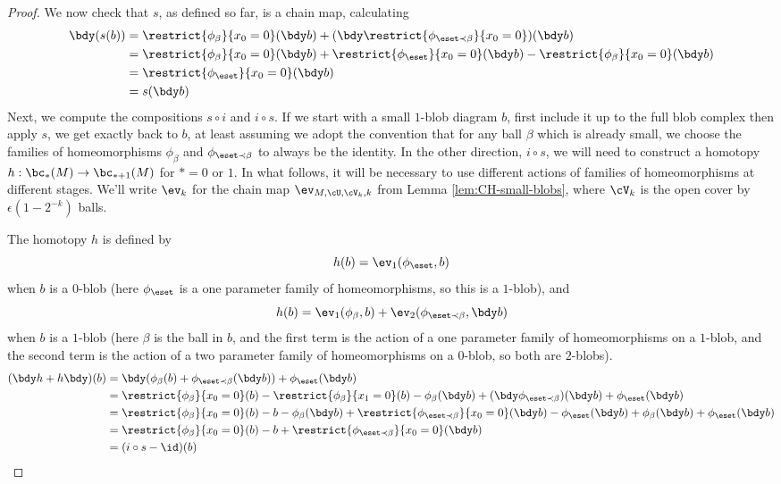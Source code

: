 \begin{proof}
We now check that $s$, as defined so far, is a chain map, calculating
\begin{align*}
\bdy (s(b)) & = \restrict{\phi_\beta}{x_0=0}(\bdy b) + (\bdy \restrict{\phi_{\eset \prec \beta}}{x_0=0})(\bdy b) \\
		 & = \restrict{\phi_\beta}{x_0=0}(\bdy b) + \restrict{\phi_\eset}{x_0=0}(\bdy b) - \restrict{\phi_\beta}{x_0=0}(\bdy b) \\
		 & = \restrict{\phi_\eset}{x_0=0}(\bdy b) \\
		 & = s(\bdy b)
\end{align*}
Next, we compute the compositions $s \circ i$ and $i \circ s$. If we start with a small $1$-blob diagram $b$, first include it up to the full blob complex then apply $s$, we get exactly back to $b$, at least assuming we adopt the convention that for any ball $\beta$ which is already small, we choose the families of homeomorphisms $\phi_\beta$ and $\phi_{\eset \prec \beta}$ to always be the identity. In the other direction, $i \circ s$, we will need to construct a homotopy $h:\bc_*(M) \to \bc_{*+1}(M)$ for $*=0$ or $1$.
In what follows, it will be necessary to use different actions of families of homeomorphisms at different stages. We'll write $\ev_k$ for the chain map $\ev_{M,\cU, \cV_k, k}$ from Lemma \ref{lem:CH-small-blobs}, where $\cV_k$ is the open cover by $\epsilon(1-2^{-k})$ balls.

The homotopy $h$ is defined by $$h(b) = \ev_1(\phi_\eset, b)$$ when $b$ is a $0$-blob (here $\phi_\eset$ is a one parameter family of homeomorphisms, so this is a $1$-blob), and $$h(b) = \ev_1(\phi_\beta,b) + \ev_2(\phi_{\eset \prec \beta},\bdy b)$$ when $b$ is a $1$-blob (here $\beta$ is the ball in $b$, and the first term is the action of a one parameter family of homeomorphisms on a $1$-blob, and the second term is the action of a two parameter family of homeomorphisms on a $0$-blob, so both are $2$-blobs).
\begin{align*}
(\bdy h+h \bdy)(b) & = \bdy (\phi_{\beta}(b) + \phi_{\eset \prec \beta}(\bdy b)) + \phi_\eset(\bdy b)  \\
	& =  \restrict{\phi_\beta}{x_0=0}(b) - \restrict{\phi_\beta}{x_1=0}(b) - \phi_\beta(\bdy b) + (\bdy \phi_{\eset \prec \beta})(\bdy b) + \phi_\eset(\bdy b) \\
	& =  \restrict{\phi_\beta}{x_0=0}(b) - b - \phi_\beta(\bdy b) + \restrict{\phi_{\eset \prec \beta}}{x_0=0}(\bdy b) -  \phi_\eset(\bdy b) + \phi_\beta(\bdy b) + \phi_\eset(\bdy b) \\
	& = \restrict{\phi_\beta}{x_0=0}(b) - b + \restrict{\phi_{\eset \prec \beta}}{x_0=0}(\bdy b) \\
	& = (i \circ s - \id)(b)
\end{align*}


\end{proof}
